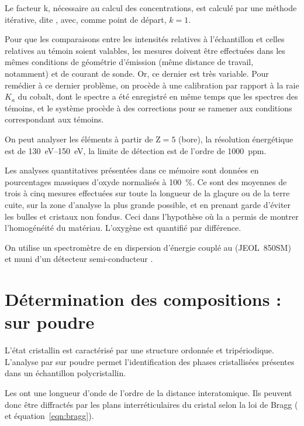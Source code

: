 Le facteur k, nécessaire au calcul des concentrations, est calculé par 
une méthode itérative, dite , avec, comme point 
de départ, $k=1$.

Pour que les comparaisons entre les intensités relatives à 
l'échantillon et celles relatives au témoin soient valables, les 
mesures doivent être effectuées dans les mêmes conditions de géométrie 
d'émission (même distance de travail, notamment) et de courant de 
sonde. Or, ce dernier est très variable. Pour remédier à ce dernier 
problème, on procède à une calibration par rapport à la raie $K_a$ 
du cobalt, dont le spectre a été enregistré en même temps que les 
spectres des témoins, et le système procède à des corrections pour 
se ramener aux conditions correspondant aux témoins.

On peut analyser les éléments à partir de $\text{Z}=5$ (bore), 
la résolution énergétique est de 
\SIrange[range-phrase=\ à\ ]{130}{150}{\electronvolt}, la limite de 
détection est de l'ordre de \SI{1000}{ppm}.

Les analyses quantitatives présentées dans ce mémoire sont données 
en pourcentages massiques d'oxyde normalisés à \SI{100}{\percent}. 
Ce sont des moyennes de trois à cinq mesures effectuées sur toute la 
longueur de la glaçure ou de la terre cuite, sur la zone d'analyse 
la plus grande possible, et en prenant garde d'éviter les bulles et 
cristaux non fondus. Ceci dans l'hypothèse où la \CL a permis de 
montrer l'homogénéité du matériau. L'oxygène est quantifié par 
différence.

On utilise un spectromètre de \RX en dispersion d'énergie couplé au 
\MEB (JEOL~850SM) et muni d'un détecteur semi-conducteur .

\section[Diffraction de \RX]
        {Détermination des compositions \cristallos : \DX sur poudre}

L'état cristallin est caractérisé par une structure ordonnée et 
tripériodique. L'analyse par \DX sur poudre permet l'identification 
des phases cristallisées présentes dans un échantillon polycristallin.

Les \RX ont une longueur d'onde de l'ordre de la distance 
interatomique. Ils peuvent donc être diffractés par les plans 
interréticulaires du cristal selon la loi de Bragg ( 
et équation~\ref{eqn:bragg}).


